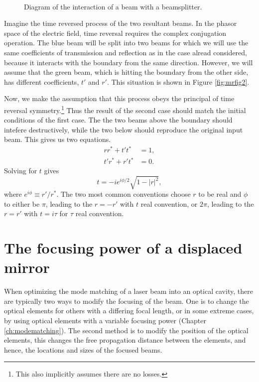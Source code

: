 \begin{figure}
  \begin{center}
  \leavevmode
  ~
  \end{center}
  \caption{Diagram of the interaction of a beam with a beamsplitter.}
  \label{fig:mrfig}
\end{figure}

Imagine the time reversed process of the two resultant beams. %
In the phasor space of the electric field, time reversal requires the complex conjugation operation. %
The blue beam will be split into two beams for which we will use the same coefficients of transmission and reflection as in the case alread considered, because it interacts with the boundary from the same direction. %
However, we will assume that the green beam, which is hitting the boundary from the other side, has different coefficients, $t'$ and $r'$. %
This situation is shown in Figure \ref{fig:mrfig2}.

Now, we make the assumption that this process obeys the principal of time reversal symmetry.\footnote{This also implicitly assumes there are no losses.} Thus the result of the second case should match the initial conditions of the first case. %
The the two beams above the boundary should intefere destructively, while the two below should reproduce the original input beam. %
This gives us two equations.
\begin{align*}
rr^*+t't^*&=1,\\
t'r^*+r't^*&=0.
\end{align*}
Solving for $t$ gives
\begin{equation}
t=-ie^{i\phi/2}\sqrt{1-|r|^2},
\end{equation}
where $e^{i\phi}\equiv r'/r^*$. %
The two most common conventions choose $r$ to be real and $\phi$ to either be $\pi$, leading to the $r=-r'$ with $t$ real convention, or $2\pi$, leading to the $r=r'$ with $t=i\tau$ for $\tau$ real convention.

\section{The focusing power of a displaced mirror}
When optimizing the mode matching of a laser beam into an optical cavity, there are typically two ways to modify the focusing of the beam. %
One is to change the optical elements for others with a differing focal length, or in some extreme cases, by using optical elements with a variable focusing power (Chapter \ref{ch:modematching}). %
The second method is to modify the position of the optical elements, this changes the free propagation distance between the elements, and hence, the locations and sizes of the focused beams.

